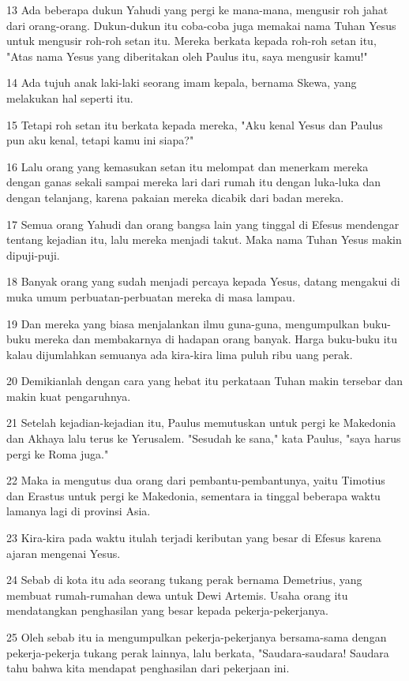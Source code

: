 \par 13 Ada beberapa dukun Yahudi yang pergi ke mana-mana, mengusir roh jahat dari orang-orang. Dukun-dukun itu coba-coba juga memakai nama Tuhan Yesus untuk mengusir roh-roh setan itu. Mereka berkata kepada roh-roh setan itu, "Atas nama Yesus yang diberitakan oleh Paulus itu, saya mengusir kamu!"
\par 14 Ada tujuh anak laki-laki seorang imam kepala, bernama Skewa, yang melakukan hal seperti itu.
\par 15 Tetapi roh setan itu berkata kepada mereka, "Aku kenal Yesus dan Paulus pun aku kenal, tetapi kamu ini siapa?"
\par 16 Lalu orang yang kemasukan setan itu melompat dan menerkam mereka dengan ganas sekali sampai mereka lari dari rumah itu dengan luka-luka dan dengan telanjang, karena pakaian mereka dicabik dari badan mereka.
\par 17 Semua orang Yahudi dan orang bangsa lain yang tinggal di Efesus mendengar tentang kejadian itu, lalu mereka menjadi takut. Maka nama Tuhan Yesus makin dipuji-puji.
\par 18 Banyak orang yang sudah menjadi percaya kepada Yesus, datang mengakui di muka umum perbuatan-perbuatan mereka di masa lampau.
\par 19 Dan mereka yang biasa menjalankan ilmu guna-guna, mengumpulkan buku-buku mereka dan membakarnya di hadapan orang banyak. Harga buku-buku itu kalau dijumlahkan semuanya ada kira-kira lima puluh ribu uang perak.
\par 20 Demikianlah dengan cara yang hebat itu perkataan Tuhan makin tersebar dan makin kuat pengaruhnya.
\par 21 Setelah kejadian-kejadian itu, Paulus memutuskan untuk pergi ke Makedonia dan Akhaya lalu terus ke Yerusalem. "Sesudah ke sana," kata Paulus, "saya harus pergi ke Roma juga."
\par 22 Maka ia mengutus dua orang dari pembantu-pembantunya, yaitu Timotius dan Erastus untuk pergi ke Makedonia, sementara ia tinggal beberapa waktu lamanya lagi di provinsi Asia.
\par 23 Kira-kira pada waktu itulah terjadi keributan yang besar di Efesus karena ajaran mengenai Yesus.
\par 24 Sebab di kota itu ada seorang tukang perak bernama Demetrius, yang membuat rumah-rumahan dewa untuk Dewi Artemis. Usaha orang itu mendatangkan penghasilan yang besar kepada pekerja-pekerjanya.
\par 25 Oleh sebab itu ia mengumpulkan pekerja-pekerjanya bersama-sama dengan pekerja-pekerja tukang perak lainnya, lalu berkata, "Saudara-saudara! Saudara tahu bahwa kita mendapat penghasilan dari pekerjaan ini.
